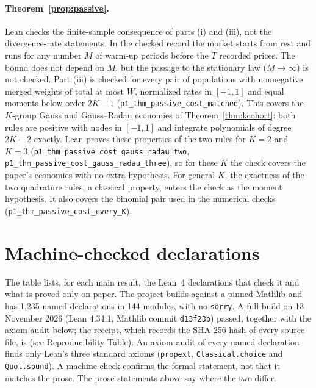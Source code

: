 \documentclass[12pt]{article}
\theoremstyle{definition}
\theoremstyle{remark}
\begin{document}
\paragraph{Theorem~\ref{prop:passive}.}
Lean checks the finite-sample consequence of parts (i) and (iii), not the divergence-rate statements. In the checked record the market starts from rest and runs for any number $M$ of warm-up periods before the $T$ recorded prices. The bound does not depend on $M$, but the passage to the stationary law ($M\to\infty$) is not checked. Part (iii) is checked for every pair of populations with nonnegative merged weights of total at most $W$, normalized rates in $[-1,1]$ and equal moments below order $2K-1$ (\texttt{p1\_thm\_passive\_cost\_matched}). This covers the $K$-group Gauss and Gauss--Radau economies of Theorem~\ref{thm:kcohort}: both rules are positive with nodes in $[-1,1]$ and integrate polynomials of degree $2K-2$ exactly. Lean proves these properties of the two rules for $K=2$ and $K=3$ (\texttt{p1\_thm\_passive\_cost\_gauss\_radau\_two}, \texttt{p1\_thm\_passive\_cost\_gauss\_radau\_three}), so for these $K$ the check covers the paper's economies with no extra hypothesis. For general $K$, the exactness of the two quadrature rules, a classical property, enters the check as the moment hypothesis. It also covers the binomial pair used in the numerical checks (\texttt{p1\_thm\_passive\_cost\_every\_K}).

\section{Machine-checked declarations}\label{app:verification}

The table lists, for each main result, the Lean~4 declarations that check it and what is proved only on paper. The project builds against a pinned Mathlib and has 1,235 named declarations in 144 modules, with no \texttt{sorry}. A full build on 13 November 2026 (Lean 4.34.1, Mathlib commit \texttt{d13f23b}) passed, together with the axiom audit below; the receipt, which records the SHA-256 hash of every source file, is (see Reproducibility Table). An axiom audit of every named declaration finds only Lean's three standard axioms (\texttt{propext}, \texttt{Classical.choice} and \texttt{Quot.sound}). A machine check confirms the formal statement, not that it matches the prose. The prose statements above say where the two differ.
\end{document}
